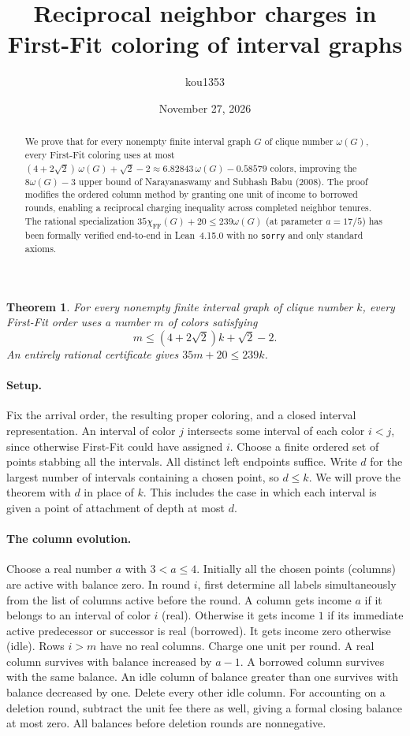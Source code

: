 \documentclass[11pt]{article}
\title{Reciprocal neighbor charges in First-Fit coloring of interval graphs}
\author{kou1353}
\date{November 27, 2026}
\newtheorem{theorem}{Theorem}
\begin{document}
\maketitle

\begin{abstract}
We prove that for every nonempty finite interval graph $G$ of clique number $\omega(G)$, every First-Fit coloring uses at most $(4+2\sqrt{2})\,\omega(G)+\sqrt{2}-2 \approx 6.82843\,\omega(G)-0.58579$ colors, improving the $8\omega(G)-3$ upper bound of Narayanaswamy and Subhash Babu (2008). The proof modifies the ordered column method by granting one unit of income to borrowed rounds, enabling a reciprocal charging inequality across completed neighbor tenures. The rational specialization $35\chi_{\mathrm{FF}}(G)+20\le 239\omega(G)$ (at parameter $a=17/5$) has been formally verified end-to-end in Lean~4.15.0 with no \texttt{sorry} and only standard axioms.
\end{abstract}

\begin{theorem}
For every nonempty finite interval graph of clique number $k$, every
First-Fit order uses a number $m$ of colors satisfying
\[
 m\le (4+2\sqrt2)k+\sqrt2-2.
\]
An entirely rational certificate gives $35m+20\le239k$.
\end{theorem}

\paragraph{Setup.}
Fix the arrival order, the resulting proper coloring, and a closed interval
representation. An interval of color $j$ intersects some interval of each
color $i<j$, since otherwise First-Fit could have assigned $i$.
Choose a finite ordered set of points stabbing all the intervals. All
distinct left endpoints suffice. Write $d$ for the largest number of
intervals containing a chosen point, so $d\le k$. We will prove the theorem
with $d$ in place of $k$. This includes the case in which each interval is
given a point of attachment of depth at most $d$.

\paragraph{The column evolution.}
Choose a real number $a$ with $3<a\le4$. Initially all the chosen points
(columns) are active with balance zero. In round $i$, first determine all
labels simultaneously from the list of columns active before the round.
A column gets income $a$ if it belongs to an interval of color $i$ (real).
Otherwise it gets income $1$ if its immediate active predecessor or
successor is real (borrowed). It gets income zero otherwise (idle).
Rows $i>m$ have no real columns. Charge one unit per round. A real
column survives with balance increased by $a-1$. A borrowed column
survives with the same balance. An idle column of balance greater than
one survives with balance decreased by one. Delete every other idle
column. For accounting on a deletion round, subtract the unit fee there
as well, giving a formal closing balance at most zero. All balances
before deletion rounds are nonnegative.
\end{document}
